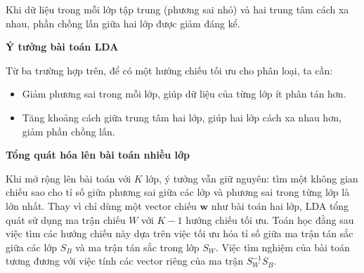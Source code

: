 \hspace{1cm}Khi dữ liệu trong mỗi lớp tập trung (phương sai nhỏ) và hai trung tâm cách xa nhau, phần chồng lấn giữa hai lớp được giảm đáng kể.  

\textbf{Ý tưởng bài toán LDA}  

Từ ba trường hợp trên, để có một hướng chiếu tối ưu cho phân loại, ta cần:  
\begin{itemize}
    \item Giảm phương sai trong mỗi lớp, giúp dữ liệu của từng lớp ít phân tán hơn.  
    \item Tăng khoảng cách giữa trung tâm hai lớp, giúp hai lớp cách xa nhau hơn, giảm phần chồng lấn.  
\end{itemize}

\textbf{Tổng quát hóa lên bài toán nhiều lớp}  

\hspace{1cm}Khi mở rộng lên bài toán với \( K \) lớp, ý tưởng vẫn giữ nguyên: tìm một không gian chiếu sao cho tỉ số giữa phương sai giữa các lớp và phương sai trong từng lớp là lớn nhất.  
Thay vì chỉ dùng một vector chiếu \( \mathbf{w} \) như bài toán hai lớp, LDA tổng quát sử dụng ma trận chiếu \( W \) với \( K-1 \) hướng chiếu tối ưu.  
Toán học đằng sau việc tìm các hướng chiếu này dựa trên việc tối ưu hóa tỉ số giữa ma trận tán sắc giữa các lớp \( S_B \) và ma trận tán sắc trong lớp \( S_W \).  
Việc tìm nghiệm của bài toán tương đương với việc tính các vector riêng của ma trận \( S_W^{-1} S_B \).  
